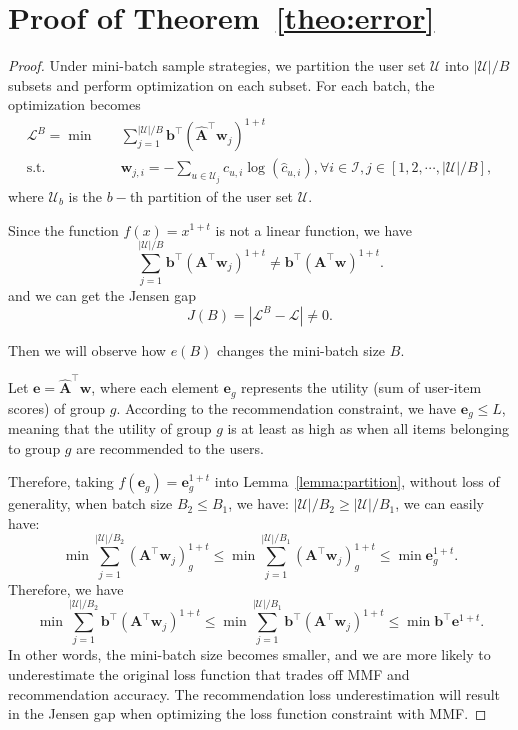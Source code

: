 \section{Proof of Theorem~\ref{theo:error}}\label{app:prof_error}

\begin{proof}
    Under mini-batch sample strategies, we partition the user set $\mathcal{U}$ into $|\mathcal{U}|/B$ subsets and perform optimization on each subset. For each batch, the optimization becomes
    \begin{equation}\label{eq:partition}
         \begin{aligned}
        \mathcal{L}^B = \min \quad& \sum_{j=1}^{|\mathcal{U}|/B} \bm{b}^{\top}(\hat{\bm{A}}^{\top}\bm{w}_j)^{1+t} \\
            \textrm{s.t.}\quad & \bm{w}_{j,i} = -\sum_{u\in\mathcal{U}_j}c_{u,i}\log (\hat{c}_{u,i}), \forall i\in\mathcal{I}, j\in [1,2,\cdots, |\mathcal{U}|/B],
    \end{aligned}
    \end{equation}
    where $\mathcal{U}_b$ is the $b-$th partition of the user set $\mathcal{U}$.

     Since the function $f(x) = x^{1+t}$ is not a linear function, we have 
    \[
        \sum_{j=1}^{|\mathcal{U}|/B} \bm{b}^{\top}(\bm{A}^{\top}\bm{w}_j)^{1+t} \neq \bm{b}^{\top}(\bm{A}^{\top}\bm{w})^{1+t}.
    \]
    and we can get the Jensen gap
    \[
        J(B) = |\mathcal{L}^B - \mathcal{L}| \neq 0.
    \]

    Then we will observe how $e(B)$ changes \wrt the mini-batch size $B$.
    
    Let $\bm{e} = \hat{\bm{A}}^{\top}\bm{w}$, where each element $\bm{e}_g$ represents the utility (sum of user-item scores) of group $g$. According to the recommendation constraint, we have $\bm{e}_g \leq L$, meaning that the utility of group $g$ is at least as high as when all items belonging to group $g$ are recommended to the users. 
    
    Therefore, taking $f(\bm{e}_g)=\bm{e}_g^{1+t}$ into Lemma~\ref{lemma:partition}, without loss of generality, when batch size $B_2\leq B_1$, we have: $|\mathcal{U}|/B_2\ge |\mathcal{U}|/B_1$,
    we can easily have:
    \[
         \min \sum_{j=1}^{|\mathcal{U}|/B_2} (\bm{A}^{\top}\bm{w}_j)_g^{1+t}\leq \min \sum_{j=1}^{|\mathcal{U}|/B_1} (\bm{A}^{\top}\bm{w}_j)_g^{1+t} \leq \min \bm{e}_g^{1+t}.
    \]
    Therefore, we have
    \[
        \min \sum_{j=1}^{|\mathcal{U}|/B_2} \bm{b}^{\top}(\bm{A}^{\top}\bm{w}_j)^{1+t}\leq \min \sum_{j=1}^{|\mathcal{U}|/B_1} \bm{b}^{\top}(\bm{A}^{\top}\bm{w}_j)^{1+t} \leq \min \bm{b}^{\top}\bm{e}^{1+t}.
    \]
    In other words, the mini-batch size becomes smaller, and we are more likely to underestimate the original loss function that trades off MMF and recommendation accuracy. The recommendation loss underestimation will result in the Jensen gap when optimizing the loss function constraint with MMF.


\end{proof}
